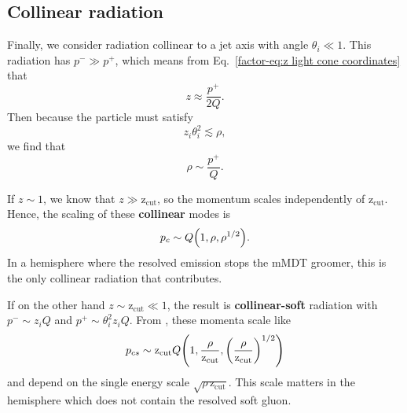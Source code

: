 \documentclass[../thesis.tex]{subfiles}
\providecommand{\zcut}{\mathrm{z_{cut}}}
\begin{document}

\subsection{Collinear radiation}\label{sec:collinear radiation}
	Finally, we consider radiation collinear to a jet axis with angle $\theta_i \ll 1$. This radiation has $p^- \gg p^+$, which means from Eq.~\ref{factor-eq:z light cone coordinates} that
	\begin{equation}
		z \approx \frac{p^+}{2Q}.
	\end{equation}
	Then because the particle must satisfy
	\begin{equation}
		z_i \theta_i^2 \lesssim \rho,
	\end{equation}
	we find that \cite{frye_factorization_2016}
	\begin{equation}
		\rho \sim \frac{p^+}{Q}.
	\end{equation}

	If $z \sim 1$, we know that $z \gg \zcut$, so the momentum scales independently of $\zcut$. Hence, the scaling of these \textbf{collinear} modes is \cite{frye_factorization_2016}
	\begin{equation}
		p_c \sim Q \qty(1, \rho, \rho^{1/2}).
	\end{equation}
	In a hemisphere where the resolved emission stops the mMDT groomer, this is the only collinear radiation that contributes.

	If on the other hand $z \sim \zcut \ll 1$, the result is \textbf{collinear-soft} radiation with $p^- \sim z_i Q$ and $p^+ \sim \theta_i^2 z_i Q$. From \cite{frye_factorization_2016}, these momenta scale like
	\begin{equation}
		p_{cs} \sim \zcut Q \qty(1, \frac{\rho}{\zcut}, \qty(\frac{\rho}{\zcut})^{1/2})
	\end{equation}
	and depend on the single energy scale $\sqrt{\rho\,\zcut}$. This scale matters in the hemisphere which does not contain the resolved soft gluon.
\end{document}
